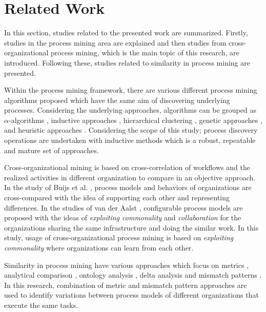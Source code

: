 \section{Related Work}
\label{sec:relatedwork}

In this section, studies related to the presented work are summarized. Firstly, studies in the process mining area are explained and then studies from cross-organizational process mining, which is the main topic of this research, are introduced. Following these, studies related to similarity in process mining are presented.

Within the process mining framework, there are various different process mining algorithms proposed which have the same aim of discovering underlying processes. Considering the underlying approaches, algorithms can be grouped as $\alpha$-algorithms \cite{van2004workflow,de2004process}, inductive approaches \cite{herbst1998integrating,herbst2000dealing}, hierarchical clustering \cite{greco2005mining}, genetic approaches \cite{van2005genetic,esgin2010hybrid}, and heuristic approaches \cite{esgin2009hybrid}. Considering the scope of this study; process discovery operations are undertaken with inductive methods which is a robust, repeatable and mature set of approaches.

Cross-organizational mining is based on cross-correlation of workflows and the realized activities in different organization to compare in an objective approach. In the study of Buijs et al. \cite{buijs2012towards}, process models and behaviors of organizations are cross-compared with the idea of supporting each other and representing differences. In the studies of van der Aalst \cite{van2011business,van2011intra}, configurable process models are proposed with the ideas of \textit{exploiting commonality} and \textit{collaboration} for the organizations sharing the same infrastructure and doing the similar work. In this study, usage of cross-organizational process mining is based on \textit{exploiting commonality} where organizations can learn from each other.

Similarity in process mining have various approaches which focus on metrics \cite{dijkman2011similarity}, analytical comparison \cite{buijs2014comparing,weidlich2011variability}, ontology analysis \cite{pascalau2010variants}, delta analysis \cite{esgin2011delta,esgin2013sequence,hallerbach2010variability} and mismatch patterns \cite{dijkman2007mismatch}. In this research, combination of metric and mismatch pattern approaches are used to identify variations between process models of different organizations that execute the same tasks.
